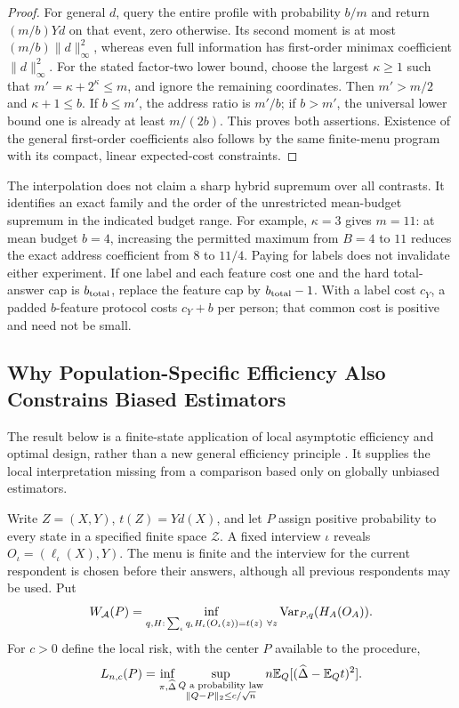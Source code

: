 \begin{proof}
For general $d$, query the entire profile with probability $b/m$ and return
$(m/b)Yd$ on that event, zero otherwise. Its second moment is at most
$(m/b)\|d\|_\infty^2$, whereas even full information has first-order minimax
coefficient $\|d\|_\infty^2$. For the stated factor-two lower bound, choose
the largest $\kappa\ge1$ such that $m'=\kappa+2^\kappa\le m$, and ignore the remaining
coordinates. Then $m'>m/2$ and $\kappa+1\le b$. If $b\le m'$, the address ratio
is $m'/b$; if $b>m'$, the universal lower bound one is already at least
$m/(2b)$. This proves both assertions. Existence of the general
first-order coefficients also follows by the same finite-menu program with
its compact, linear expected-cost constraints.
\end{proof}

The interpolation does not claim a sharp hybrid supremum over all contrasts.
It identifies an exact family and the order of the unrestricted mean-budget
supremum in the indicated budget range. For example, $\kappa=3$ gives $m=11$:
at mean budget $b=4$, increasing the permitted maximum from $B=4$ to $11$
reduces the exact address coefficient from $8$ to $11/4$. Paying for labels
does not invalidate either experiment. If one label and each feature cost
one and the hard total-answer cap is $b_{\rm total}$, replace the feature
cap by $b_{\rm total}-1$. With a label cost $c_Y$, a padded $b$-feature
protocol costs $c_Y+b$ per person; that common cost is positive and need not
be small.

\subsection{Why Population-Specific Efficiency Also Constrains Biased Estimators}
\label{app:localminimax}
The result below is a finite-state application of local asymptotic efficiency
and optimal design, rather than a new general efficiency principle
\citep{robins1994,tsiatis2006,hahn2011,barnes2020}. It supplies the local
interpretation missing from a comparison based only on globally unbiased
estimators.

Write $Z=(X,Y)$, $t(Z)=Yd(X)$, and let $P$ assign positive probability to
every state in a specified finite space $\mathcal Z$. A fixed interview
$\iota$ reveals $O_\iota=(\ell_\iota(X),Y)$. The menu is finite and the interview for
the current respondent is chosen before their answers, although all previous
respondents may be used. Put
\[
 W_{\mathcal A}(P)=\inf_{q,H:\,\sum_\iota q_\iota H_\iota(O_\iota(z))=t(z)\ \forall z}
                      \operatorname{Var}_{P,q}(H_A(O_A)).
\]
For $c>0$ define the local risk, with the center $P$ available to the procedure,
\[
 L_{n,c}(P)=\inf_{\pi,\widehat\Delta}
       \sup_{\substack{Q\text{ a probability law}\\
                        \|Q-P\|_2\le c/\sqrt n}}
       n\mathbb{E}_Q[(\widehat\Delta-\mathbb{E}_Qt)^2].
\]

